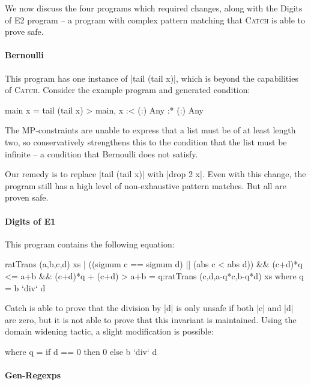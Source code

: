 \documentclass[preprint]{sigplanconf}
\newcommand{\catch}{\textsc{Catch}}
\begin{document}
We now discuss the four programs which required changes, along with the Digits of E2 program -- a program with complex pattern matching that \catch{} is able to prove safe.

\paragraph{Bernoulli}

This program has one instance of |tail (tail x)|, which is beyond the capabilities of \catch{}. Consider the example program and generated condition:

\begin{code}
main x = tail (tail x)
> main, x :< {(:) Any} :* {(:) Any}
\end{code}

The MP-constraints are unable to express that a list must be of at least length two, so conservatively strengthens this to the condition that the list must be infinite -- a condition that Bernoulli does not satisfy.

Our remedy is to replace |tail (tail x)| with |drop 2 x|. Even with this change, the program still has a high level of non-exhaustive pattern matches. But all are proven safe.


\paragraph{Digits of E1}

This program contains the following equation:

\begin{code}
ratTrans (a,b,c,d) xs |
  ((signum c == signum d) || (abs c < abs d)) &&
  (c+d)*q <= a+b && (c+d)*q + (c+d) > a+b
     = q:ratTrans (c,d,a-q*c,b-q*d) xs
  where q = b `div` d
\end{code}

Catch is able to prove that the division by |d| is only unsafe if both |c| and |d| are zero, but it is not able to prove that this invariant is maintained. Using the domain widening tactic, a slight modification is possible:

\begin{code}
  where q = if d == 0 then 0 else b `div` d
\end{code}

\paragraph{Gen-Regexps}
\end{document}
